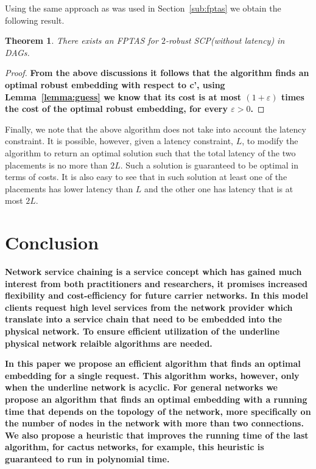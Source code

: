 \documentclass[11pt]{article}
\newcommand{\fix}[1]{{\color{purple}\textbf{#1}}}
\newtheorem{theorem}{Theorem}
\newcommand{\scp}{\textsc{SCP}\xspace}
\begin{document}
Using the same approach as was used in Section~\ref{sub:fptas} we
obtain the following result.

\begin{theorem}
There exists an FPTAS for $2$-robust \scp (without latency) in DAGs.
\end{theorem}

\begin{proof}
  \fix{From the above discussions it follows that the algorithm finds an optimal robust embedding with respect to c', using Lemma~\ref{lemma:guess} we know that its cost is at most $(1 + \varepsilon)$ times the cost of the optimal robust embedding, for every $\varepsilon > 0$.}
\end{proof}

Finally, we note that the above algorithm does not take into account
the latency constraint.  It is possible, however, given a latency
constraint, $L$, to modify the algorithm to return an optimal solution
such that the total latency of the two placements is no more than
$2L$.  Such a solution is guaranteed to be optimal in terms of costs.
It is also easy to see that in such solution at least one of the
placements has lower latency than $L$ and the other one has latency
that is at most $2L$.


\section{Conclusion}
\fix{%
Network service chaining is a service concept which has gained much interest from both practitioners and researchers, it promises increased flexibility and cost-efficiency for future carrier networks. 
In this model clients request high level services from the network provider which translate into a service chain that need to be embedded into the physical network.
To ensure efficient utilization of the underline physical network relaible algorithms are needed.
}

\fix{%
In this paper we propose an efficient algorithm that finds an optimal embedding for a single request.
This algorithm works, however, only when the underline network is acyclic.
For general networks we propose an algorithm that finds an optimal embedding with a running time that depends on the topology of the network, more specifically on the number of nodes in the network with more than two connections.
We also propose a heuristic that improves the running time of the last algorithm, for cactus networks, for example, this heuristic is guaranteed to run in polynomial time.
}
\end{document}
